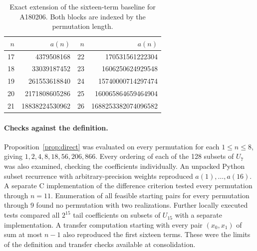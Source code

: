 \documentclass[11pt]{article}
\begin{document}
\begin{table}[htbp]\centering
\caption{Exact extension of the sixteen-term baseline for A180206.
Both blocks are indexed by the permutation length.}\label{tab:terms}
\begin{tabular}{rr@{\qquad}rr}\toprule
\(n\)&\(a(n)\)&\(n\)&\(a(n)\)\\\midrule
17 & 4379508168    & 22 & 170531561222304\\
18 & 33039187452   & 23 & 1606250624929548\\
19 & 261553618840  & 24 & 15740000714297474\\
20 & 2171808605286 & 25 & 160065864659464904\\
21 & 18838224530962& 26 & 1688253382074096582\\\bottomrule
\end{tabular}
\end{table}

\paragraph{Checks against the definition.}
Proposition~\ref{prop:direct} was evaluated on every permutation for
each \(1\le n\le8\), giving \(1,2,4,8,18,56,206,866\).
Every ordering of each of the 128 subsets of \(U_7\) was also examined,
checking the coefficients individually. An unpacked Python subset recurrence
with arbitrary-precision weights reproduced \(a(1),\ldots,a(16)\).
A separate C implementation of the difference criterion tested every
permutation through \(n=11\). Enumeration of all feasible starting pairs
for every permutation through 9 found no permutation with two realizations.
Further locally executed tests compared all \(2^{15}\) tail coefficients
on subsets of \(U_{15}\) with a separate implementation. A transfer computation
starting with every pair \((x_0,x_1)\) of sum at most \(n-1\) also
reproduced the first sixteen terms. These were the limits of the
definition and transfer checks available at consolidation.
\end{document}
